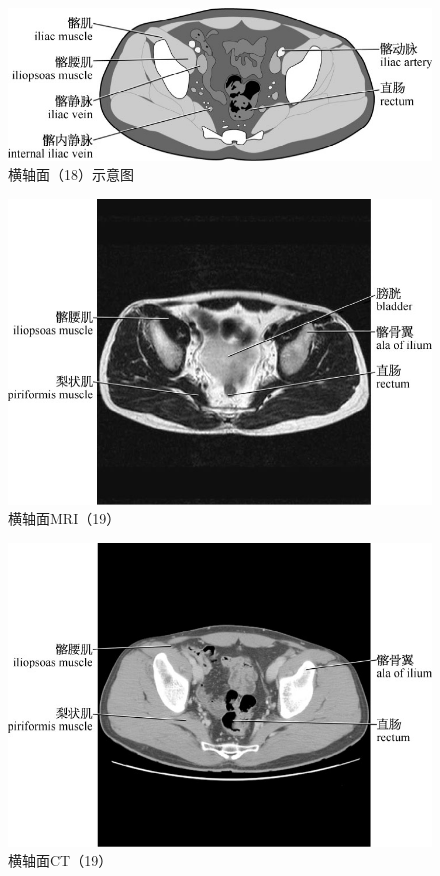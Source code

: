 \begin{figure}[!htbp]
 \centering
 \includegraphics{./images/Image00055.jpg}
 \captionsetup{justification=centering}
 \caption{横轴面（18）示意图}
  \end{figure} 
 \FloatBarrier

\begin{figure}[!htbp]
 \centering
 \includegraphics{./images/Image00056.jpg}
 \captionsetup{justification=centering}
 \caption{横轴面MRI（19）}
  \end{figure} 
 \FloatBarrier

\begin{figure}[!htbp]
 \centering
 \includegraphics{./images/Image00057.jpg}
 \captionsetup{justification=centering}
 \caption{横轴面CT（19）}
  \end{figure} 
 \FloatBarrier

